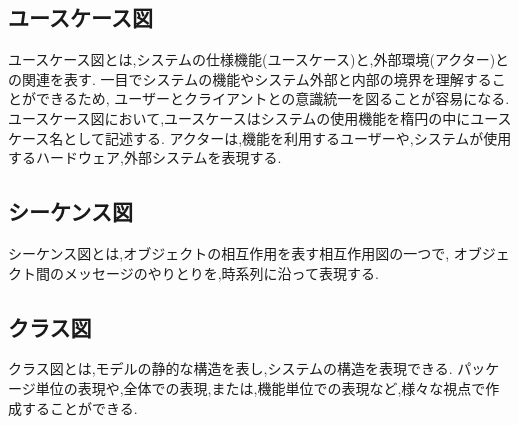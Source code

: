 \subsection{ユースケース図}
ユースケース図とは,システムの仕様機能(ユースケース)と,外部環境(アクター)との関連を表す\cite{uml}.
一目でシステムの機能やシステム外部と内部の境界を理解することができるため,
ユーザーとクライアントとの意識統一を図ることが容易になる.
ユースケース図において,ユースケースはシステムの使用機能を楕円の中にユースケース名として記述する.
アクターは,機能を利用するユーザーや,システムが使用するハードウェア,外部システムを表現する.

\subsection{シーケンス図}
シーケンス図とは,オブジェクトの相互作用を表す相互作用図の一つで,
オブジェクト間のメッセージのやりとりを,時系列に沿って表現する\cite{uml}.

\subsection{クラス図}
クラス図とは,モデルの静的な構造を表し,システムの構造を表現できる\cite{uml}.
パッケージ単位の表現や,全体での表現,または,機能単位での表現など,様々な視点で作成することができる.
